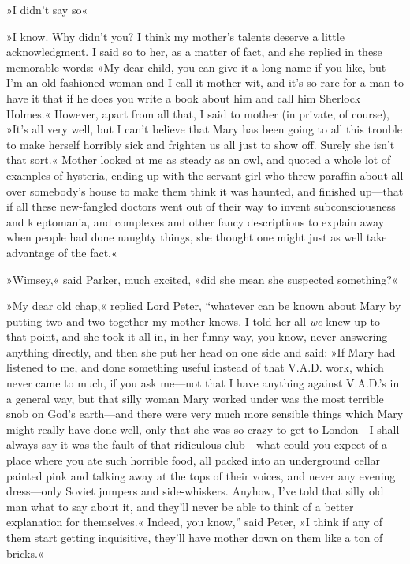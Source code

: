 »I didn't say so\longdash«

»I know. Why didn't you? I think my mother's talents deserve a little acknowledgment. I said so to her, as a matter of fact, and she replied in these memorable words: »My dear child, you can give it a long name if you like, but I'm an old-fashioned woman and I call it mother-wit, and it's so rare for a man to have it that if he does you write a book about him and call him Sherlock Holmes.« However, apart from all that, I said to mother (in private, of course), »It's all very well, but I can't believe that Mary has been going to all this trouble to make herself horribly sick and frighten us all just to show off. Surely she isn't that sort.« Mother looked at me as steady as an owl, and quoted a whole lot of examples of hysteria, ending up with the servant-girl who threw paraffin about all over somebody's house to make them think it was haunted, and finished up\allowbreak---\allowbreak that if all these new-fangled doctors went out of their way to invent subconsciousness and kleptomania, and complexes and other fancy descriptions to explain away when people had done naughty things, she thought one might just as well take advantage of the fact.«

»Wimsey,« said Parker, much excited, »did she mean she suspected something?«

»My dear old chap,« replied Lord Peter, \enquote{whatever can be known about Mary by putting two and two together my mother knows. I told her all \textit{we} knew up to that point, and she took it all in, in her funny way, you know, never answering anything directly, and then she put her head on one side and said: »If Mary had listened to me, and done something useful instead of that V.A.D. work, which never came to much, if you ask me\allowbreak---\allowbreak not that I have anything against V.A.D.'s in a general way, but that silly woman Mary worked under was the most terrible snob on God's earth\allowbreak---\allowbreak and there were very much more sensible things which Mary might really have done well, only that she was so crazy to get to London\allowbreak---\allowbreak I shall always say it was the fault of that ridiculous club\allowbreak---\allowbreak what could you expect of a place where you ate such horrible food, all packed into an underground cellar painted pink and talking away at the tops of their voices, and never any evening dress\allowbreak---\allowbreak only Soviet jumpers and side-whiskers. Anyhow, I've told that silly old man what to say about it, and they'll never be able to think of a better explanation for themselves.« Indeed, you know,} said Peter, »I think if any of them start getting inquisitive, they'll have mother down on them like a ton of bricks.«


